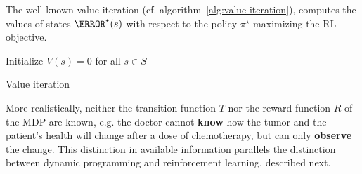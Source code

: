 The well-known value iteration (cf. algorithm~\ref{alg:value-iteration}), computes the values of states $\V^{\star}(s)$ with respect to the policy $\pi^{\star}$ maximizing the RL objective. 

\begin{algorithm}
    Initialize $V(s) = 0$ for all $s \in S$ \\
    \caption{Value iteration~\cite{sutton}}\label{alg:value-iteration}
\end{algorithm}

More realistically, neither the transition function $T$ nor the reward function $R$ of the MDP are known, e.g. the doctor cannot \textbf{know} how the tumor and the patient's health will change after a dose of chemotherapy, but can only \textbf{observe} the change.
This distinction in available information parallels the distinction between dynamic programming and reinforcement learning, described next. 

